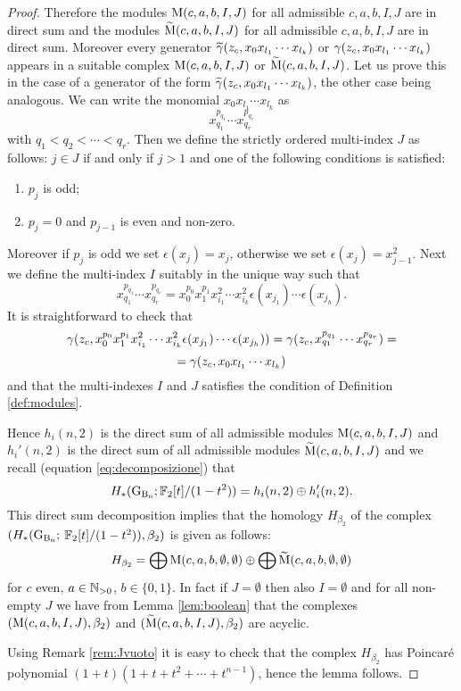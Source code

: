 \begin{proof}
Therefore the modules $\operatorname{\mathrm{M}}(c,a,b,I,J)$ for all admissible $c,a,b,I,J$ are in direct sum and the modules $\widetilde{\mathrm{M}}(c,a,b,I,J)$ for all admissible $c,a,b,I,J$ are in direct sum.
Moreover every generator 
$\widetilde{\gamma} (z_c, x_0 x_{l_1} \cdots x_{l_k})$ or $\operatorname{\gamma} (z_c, x_0 x_{l_1} \cdots x_{l_k})$ appears in a suitable 
complex  $\operatorname{\mathrm{M}}(c,a,b,I,J)$ or $\widetilde{\mathrm{M}}(c,a,b,I,J)$. 
Let us prove this in the case of a generator of the form $\widetilde{\gamma} (z_c, x_0 x_{l_1} \cdots x_{l_k})$, the other case being analogous. We can write the monomial $x_0x_{l_1} \cdots x_{l_k}$ as
$$
x_{q_1}^{p_{q_1}} \cdots x_{q_r}^{p_{q_r}} 
$$
with $q_1 < q_2 < \cdots < q_r$. %
Then we define the strictly ordered multi-index $J$ as follows: $j \in J$ if and only if $j>1$ and one of the following conditions is satisfied:
\begin{enumerate}
	\item  $p_j$ is odd;
	\item $p_j=0$ and $p_{j-1}$ is even and non-zero.
\end{enumerate}
Moreover if $p_j$ is odd we set $\epsilon(x_j) = x_j$, otherwise we set $\epsilon(x_j) = x_{j-1}^2$.
Next we define the multi-index $I$ suitably in the unique way such that 
$$
x_{q_1}^{p_{q_1}} \cdots x_{q_r}^{p_{q_r}} = x_0^{p_0} x_1^{p_1} x_{i_1}^2 \cdots x_{i_k}^2\epsilon(x_{j_1})\cdots \epsilon(x_{j_h}).
$$
It is straightforward to check that 
$$
\operatorname{\gamma} (z_c, x_0^{p_0} x_1^{p_1} x_{i_1}^2 \cdots x_{i_k}^2\epsilon(x_{j_1})\cdots \epsilon(x_{j_h})) = \operatorname{\gamma} (z_c,  x_{q_1}^{p_{q_1}} \cdots x_{q_r}^{p_{q_r}} ) = 
$$
$$
=\operatorname{\gamma} (z_c, x_0 x_{l_1} \cdots x_{l_k})
$$
and that the multi-indexes $I$ and $J$ satisfies the condition of Definition \ref{def:modules}.

Hence 
$h_{i}(n,2)$ is the direct sum of all admissible modules $\operatorname{\mathrm{M}}(c,a,b,I,J)$ and 
$h_{i}'(n,2)$ is
the direct sum of all admissible modules $\widetilde{\mathrm{M}}(c,a,b,I,J)$ and we recall (equation \eqref{eq:decomposizione}) that
$$
H_*(\operatorname{G_{B_{n}}}; \mathbb{F}_2[t]/(1-t^2)) = h_{i}(n,2) \oplus h_{i}'(n,2).
$$
This direct sum decomposition  implies that the homology $H_{\beta_2}$ of the complex $(H_*(\operatorname{G_{B_{n}}};$ $\mathbb{F}_2[t]/(1-t^2)), \beta_2)$ is given as follows:
$$
H_{\beta_2} = \bigoplus \operatorname{\mathrm{M}}(c,a,b,\emptyset, \emptyset)
\oplus
\bigoplus \widetilde{\mathrm{M}}(c,a,b,\emptyset, \emptyset)
$$
for $c$ even, $a \in {\mathbb{N}}_{>0}$, $b \in \{0,1\}$. In fact if $J = \emptyset$ then also $I = \emptyset$ and for all non-empty $J$ we have from Lemma \ref{lem:boolean} that the complexes $(\operatorname{\mathrm{M}}(c,a,b,I,J),\beta_2)$ and $(\widetilde{\mathrm{M}}(c,a,b,I,J),\beta_2)$ are acyclic.

Using Remark \ref{rem:Jvuoto}  it is easy to check that the complex $H_{\beta_2}$ has Poincar\'e polynomial $(1+t)(1+t+t^2+ \cdots + t^{n-1})$, hence the lemma follows.
\end{proof}


